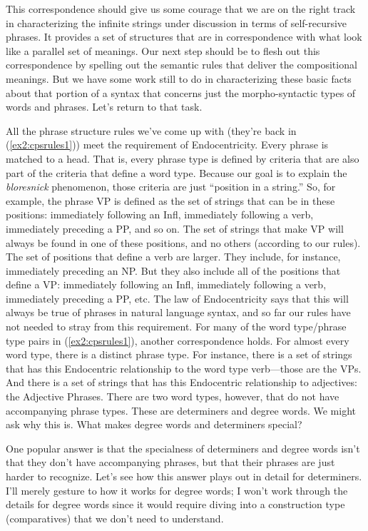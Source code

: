 This correspondence should give us some courage that we are on the right track in characterizing the infinite strings under discussion in terms of self-recursive phrases. It provides a set of structures that are in correspondence with what look like a parallel set of meanings. Our next step should be to flesh out this correspondence by spelling out the semantic rules that deliver the compositional meanings. But we have some work still to do in characterizing these basic facts about that portion of a syntax that concerns just the morpho-syntactic types of words and phrases. Let's return to that task. 

All the phrase structure rules we've come up with (they're back in (\ref{ex2:cpsrules1})) meet the requirement of Endocentricity. Every phrase is matched to a head. That is, every phrase type is defined by criteria that are also part of the criteria that define a word type. Because our goal is to explain the \emph{bloresnick} phenomenon, those criteria are just ``position in a string.'' So, for example, the phrase VP is defined as the set of strings that can be in these positions: immediately following an Infl, immediately following a verb, immediately preceding a PP, and so on. The set of strings that make VP will always be found in one of these positions, and no others (according to our rules). The set of positions that define a verb are larger. They include, for instance, immediately preceding an NP. But they also include all of the positions that define a VP: immediately following an Infl, immediately following a verb, immediately preceding a PP, etc. The law of Endocentricity says that this will always be true of phrases in natural language syntax, and so far our rules have not needed to stray from this requirement. For many of the word type/phrase type pairs in (\ref{ex2:cpsrules1}), another correspondence holds. For almost every word type, there is a distinct phrase type. For instance, there is a set of strings that has this Endocentric relationship to the word type verb---those are the VPs. And there is a set of strings that has this Endocentric relationship to adjectives: the Adjective Phrases. There are two word types, however, that do not have accompanying phrase types. These are determiners and degree words. We might ask why this is. What makes degree words and determiners special?

One popular answer is that the specialness of determiners and degree words isn't that they don't have accompanying phrases, but that their phrases are just harder to recognize. Let's see how this answer plays out in detail for determiners. I'll merely gesture to how it works for degree words; I won't work through the details for degree words since it would require diving into a construction type (comparatives) that we don't need to understand.

